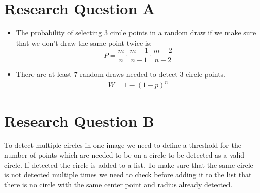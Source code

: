 \section{Research Question A}
\begin{itemize}
	\item The probability of selecting 3 circle points in a random draw if we make sure that we don't draw the same point twice is:
	\begin{displaymath}
	P = \frac{m}{n} \cdot \frac{m-1}{n-1} \cdot \frac{m-2}{n-2}
	\end{displaymath}
	\item There are at least 7 random draws needed to detect 3 circle points.
	\begin{eqnarray*}
	W = 1-(1-p)^n
	
	\end{eqnarray*}
\end{itemize}


\section{Research Question B}

To detect multiple circles in one image we need to define a threshold for the number of points which are needed to be on a circle to be detected as a valid circle. If detected the circle is added to a list. To make sure that the same circle is not detected multiple times we need to check before adding it to the list that there is no circle with the same center point and radius already detected.